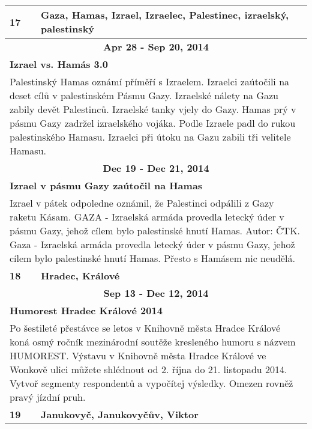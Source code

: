 \begin{tabularx}{\linewidth}{l l}
            \bf 17 & \bf Gaza, Hamas, Izrael, Izraelec, Palestinec, izraelský, palestinský \\ \midrule
            
                \multicolumn{2}{c}{\bf Apr 28 - Sep 20, 2014} \\
                \multicolumn{2}{p{\linewidth}}{\bf Izrael vs. Hamás 3.0} \\
                \multicolumn{2}{p{\linewidth}}{Palestinský Hamas oznámí příměří s Izraelem. Izraelci zaútočili na deset cílů v palestinském Pásmu Gazy. Izraelské nálety na Gazu zabily devět Palestinců. Izraelské tanky vjely do Gazy. Hamas prý v pásmu Gazy zadržel izraelského vojáka. Podle Izraele padl do rukou palestinského Hamasu. Izraelci při útoku na Gazu zabili tři velitele Hamasu.} \\ \midrule
                
                \multicolumn{2}{c}{\bf Dec 19 - Dec 21, 2014} \\
                \multicolumn{2}{p{\linewidth}}{\bf Izrael v pásmu Gazy zaútočil na Hamas} \\
                \multicolumn{2}{p{\linewidth}}{Izrael v pátek odpoledne oznámil, že Palestinci odpálili z Gazy raketu Kásam. GAZA - Izraelská armáda provedla letecký úder v pásmu Gazy, jehož cílem bylo palestinské hnutí Hamas. Autor: ČTK. Gaza - Izraelská armáda provedla letecký úder v pásmu Gazy, jehož cílem bylo palestinské hnutí Hamas. Přesto s Hamásem nic neudělá.} \\ \midrule
                [1.5pt]

            \bf 18 & \bf Hradec, Králové \\ \midrule
            
                \multicolumn{2}{c}{\bf Sep 13 - Dec 12, 2014} \\
                \multicolumn{2}{p{\linewidth}}{\bf Humorest Hradec Králové 2014} \\
                \multicolumn{2}{p{\linewidth}}{Po šestileté přestávce se letos v Knihovně města Hradce Králové koná osmý ročník mezinárodní soutěže kresleného humoru s názvem HUMOREST. Výstavu v Knihovně města Hradce Králové ve Wonkově ulici můžete shlédnout od 2. října do 21. listopadu 2014. Vytvoř segmenty respondentů a vypočítej výsledky. Omezen rovněž pravý jízdní pruh.} \\ \midrule
                [1.5pt]

            \bf 19 & \bf Janukovyč, Janukovyčův, Viktor \\ \midrule
            

\end{tabularx}
